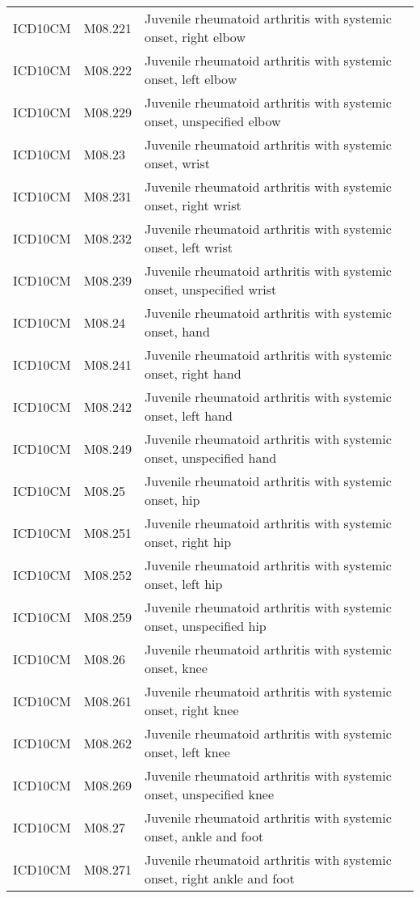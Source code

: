 \begin{table}[ht]
\begin{tabular}{lll}
  ICD10CM & M08.221 & Juvenile rheumatoid arthritis with systemic onset, right elbow \\ 
  ICD10CM & M08.222 & Juvenile rheumatoid arthritis with systemic onset, left elbow \\ 
  ICD10CM & M08.229 & Juvenile rheumatoid arthritis with systemic onset, unspecified elbow \\ 
  ICD10CM & M08.23 & Juvenile rheumatoid arthritis with systemic onset, wrist \\ 
  ICD10CM & M08.231 & Juvenile rheumatoid arthritis with systemic onset, right wrist \\ 
  ICD10CM & M08.232 & Juvenile rheumatoid arthritis with systemic onset, left wrist \\ 
  ICD10CM & M08.239 & Juvenile rheumatoid arthritis with systemic onset, unspecified wrist \\ 
  ICD10CM & M08.24 & Juvenile rheumatoid arthritis with systemic onset, hand \\ 
  ICD10CM & M08.241 & Juvenile rheumatoid arthritis with systemic onset, right hand \\ 
  ICD10CM & M08.242 & Juvenile rheumatoid arthritis with systemic onset, left hand \\ 
  ICD10CM & M08.249 & Juvenile rheumatoid arthritis with systemic onset, unspecified hand \\ 
  ICD10CM & M08.25 & Juvenile rheumatoid arthritis with systemic onset, hip \\ 
  ICD10CM & M08.251 & Juvenile rheumatoid arthritis with systemic onset, right hip \\ 
  ICD10CM & M08.252 & Juvenile rheumatoid arthritis with systemic onset, left hip \\ 
  ICD10CM & M08.259 & Juvenile rheumatoid arthritis with systemic onset, unspecified hip \\ 
  ICD10CM & M08.26 & Juvenile rheumatoid arthritis with systemic onset, knee \\ 
  ICD10CM & M08.261 & Juvenile rheumatoid arthritis with systemic onset, right knee \\ 
  ICD10CM & M08.262 & Juvenile rheumatoid arthritis with systemic onset, left knee \\ 
  ICD10CM & M08.269 & Juvenile rheumatoid arthritis with systemic onset, unspecified knee \\ 
  ICD10CM & M08.27 & Juvenile rheumatoid arthritis with systemic onset, ankle and foot \\ 
  ICD10CM & M08.271 & Juvenile rheumatoid arthritis with systemic onset, right ankle and foot \\ 

\end{tabular}
\end{table}
